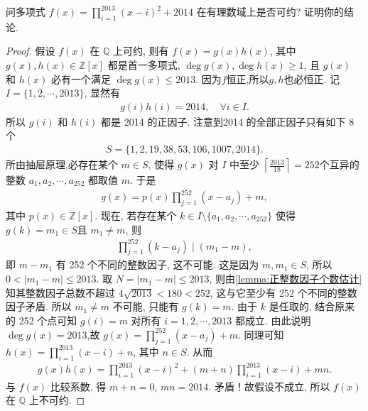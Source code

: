 \documentclass[../../main.tex]{subfiles}%
\begin{document}
\begin{example}
问多项式 \(f(x) = \prod\limits_{i=1}^{2013} (x-i)^2 + 2014\) 在有理数域上是否可约? 证明你的结论.
\end{example}
\begin{proof}
假设 \(f(x)\) 在 \(\mathbb{Q}\) 上可约, 则有 \(f(x)=g(x)h(x)\), 其中 \(g(x),h(x) \in \mathbb{Z}[x]\) 都是首一多项式, \(\deg g(x), \deg h(x) \geqslant 1\), 且 \(g(x)\) 和 \(h(x)\) 必有一个满足 \(\deg g(x) \leqslant 2013\). 因为$f$恒正,所以$g,h$也必恒正.
记 \(I=\{1,2,\cdots,2013\}\), 显然有
\begin{align*}
g(i)h(i) = 2014, \quad \forall i \in I.
\end{align*}
所以 \(g(i)\) 和 \(h(i)\) 都是 2014 的正因子. 注意到2014 的全部正因子只有如下 8 个
\begin{align*}
S = \{1,2,19,38,53,106,1007,2014\}.
\end{align*}
所由抽屉原理,必存在某个 \(m\in S\), 使得 \(g(x)\) 对 \(I\) 中至少 $\left\lceil \frac{2013}{18} \right\rceil=252 $个互异的整数 \(a_1,a_2,\cdots,a_{252}\) 都取值 \(m\). 于是
\begin{align*}
g(x) = p(x) \prod\limits_{j=1}^{252} (x-a_j) + m,
\end{align*}
其中 \(p(x)\in \mathbb{Z}[x]\). 现在, 若存在某个 \(k\in I\setminus\{a_1,a_2,\cdots,a_{252}\}\) 使得 \(g(k) = m_1 \in S\)且 \(m_1\neq m\), 则
\begin{align*}
\prod\limits_{j=1}^{252} (k-a_j) \mid (m_1-m),
\end{align*}
即 \(m-m_1\) 有 252 个不同的整数因子, 这不可能. 这是因为 \(m,m_1\in S\), 所以 \(0<|m_1-m|\leqslant 2013\).
取 \(N=|m_1-m|\leqslant 2013\), 则由\cref{lemma:正整数因子个数估计}知其整数因子总数不超过 \(4\sqrt{2013}<180<252\), 这与它至少有 252 个不同的整数因子矛盾.
所以 \(m_1\neq m\) 不可能, 只能有 \(g(k)=m\). 由于 \(k\) 是任取的, 结合原来的 252 个点可知 \(g(i)=m\) 对所有 \(i=1,2,\cdots,2013\) 都成立. 由此说明 \(\deg g(x)=2013\),故
$g(x) = \prod\limits_{j=1}^{252} (x-a_j) + m.$
同理可知 \(h(x) = \prod\limits_{i=1}^{2013} (x-i) + n\), 其中 \(n\in S\). 从而
\begin{align*}
g(x)h(x) = \prod\limits_{i=1}^{2013} (x-i)^2 + (m+n) \prod\limits_{i=1}^{2013} (x-i) + mn.
\end{align*}
与 \(f(x)\) 比较系数, 得 \(m+n=0\), \(mn=2014\). 矛盾！故假设不成立, 所以 \(f(x)\) 在 \(\mathbb{Q}\) 上不可约.
\end{proof}
\end{document}
